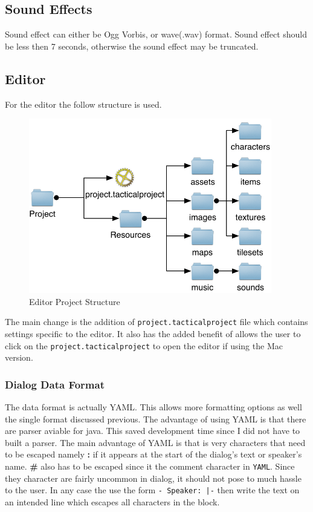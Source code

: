 \subsection{Sound Effects}
Sound effect can either be Ogg Vorbis, or wave(.wav) format. Sound effect should be less then 7 seconds, otherwise the sound effect may be truncated. 

\clearpage
\subsection{Editor}
For the editor the follow structure is used.

\begin{figure}[htbp]
	\centering
		\includegraphics[height=3in]{figures/project.pdf}
	\caption{Editor Project Structure}
	\label{fig:figures_project}
\end{figure}

The main change is the addition of \texttt{project.tacticalproject} file which contains settings specific to the editor. It also has the added benefit of allows the user to click on the \texttt{project.tacticalproject} to open the editor if using the Mac version.

\subsubsection{Dialog Data Format}
\label{ssub:dialog_data_format}

The data format is actually YAML\cite{yaml}. This allows more formatting options as well the single format discussed previous. The advantage of using YAML is that there are parser aviable for java\cite{snake}. This saved development time since I did not have to built a parser. The main advantage of YAML is that is very characters that need to be escaped namely \textbf{:} if it appears at the start of the dialog's text or speaker's name. \textbf{\#} also has to be escaped since it the comment character in \texttt{YAML}. Since they character are fairly uncommon in dialog, it should not pose to much hassle to the user. In any case the use  the form \texttt{- Speaker: |-} then  write the text on an intended line which escapes all characters in the block.


